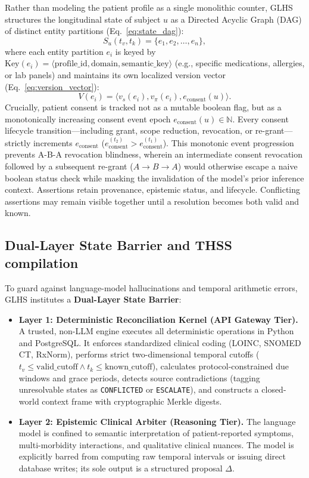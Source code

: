 \documentclass[11pt]{article}
\begin{document}
Rather than modeling the patient profile as a single monolithic counter, GLHS structures the longitudinal state of subject $u$ as a Directed Acyclic Graph (DAG) of distinct entity partitions (Eq.~\ref{eq:state_dag}):
\begin{equation}
S_u(t_v,t_k) = \{ e_1, e_2, \dots, e_n \},
\label{eq:state_dag}
\end{equation}
where each entity partition $e_i$ is keyed by $\text{Key}(e_i) = \langle \text{profile\_id}, \text{domain}, \text{semantic\_key} \rangle$ (e.g., specific medications, allergies, or lab panels) and maintains its own localized version vector (Eq.~\ref{eq:version_vector}):
\begin{equation}
V(e_i) = \langle v_s(e_i), v_{\pi}(e_i), e_{\text{consent}}(u) \rangle.
\label{eq:version_vector}
\end{equation}
Crucially, patient consent is tracked not as a mutable boolean flag, but as a monotonically increasing consent event epoch $e_{\text{consent}}(u) \in \mathbb{N}$. Every consent lifecycle transition---including grant, scope reduction, revocation, or re-grant---strictly increments $e_{\text{consent}}$ ($e_{\text{consent}}^{(t_2)} > e_{\text{consent}}^{(t_1)}$). This monotonic event progression prevents A-B-A revocation blindness, wherein an intermediate consent revocation followed by a subsequent re-grant ($A \to B \to A$) would otherwise escape a naive boolean status check while masking the invalidation of the model's prior inference context. Assertions retain provenance, epistemic status, and lifecycle. Conflicting assertions may remain visible together until a resolution becomes both valid and known.

\subsection{Dual-Layer State Barrier and THSS compilation}
To guard against language-model hallucinations and temporal arithmetic errors, GLHS institutes a \textbf{Dual-Layer State Barrier}:
\begin{itemize}
  \item \textbf{Layer 1: Deterministic Reconciliation Kernel (API Gateway Tier).} A trusted, non-LLM engine executes all deterministic operations in Python and PostgreSQL. It enforces standardized clinical coding (LOINC, SNOMED CT, RxNorm), performs strict two-dimensional temporal cutoffs ($t_v \le \text{valid\_cutoff} \land t_k \le \text{known\_cutoff}$), calculates protocol-constrained due windows and grace periods, detects source contradictions (tagging unresolvable states as \texttt{CONFLICTED} or \texttt{ESCALATE}), and constructs a closed-world context frame with cryptographic Merkle digests.
  \item \textbf{Layer 2: Epistemic Clinical Arbiter (Reasoning Tier).} The language model is confined to semantic interpretation of patient-reported symptoms, multi-morbidity interactions, and qualitative clinical nuances. The model is explicitly barred from computing raw temporal intervals or issuing direct database writes; its sole output is a structured proposal $\Delta$.
\end{itemize}
\end{document}
